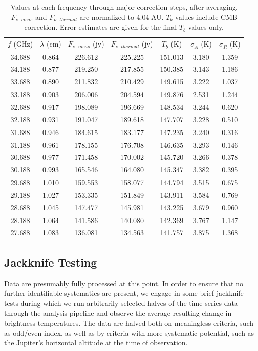 \documentclass{article}
\newcommand{\tableend}{\\}
\begin{document}
	\begin{table}
	\centering
	\begin{tabular}{cc || c | c | c | c | c }
	$f$ (GHz) & $\lambda$ (cm) & $F_{\nu,\,meas}$ (jy) & $F_{\nu,\,thermal}$ (jy) & $T_b$ (K) & $\sigma_{A}$ (K) & $\sigma_{R}$ (K) \\\hhline{==#=|=|=|=|=}
	34.688 & 0.864 & 226.612 & 225.225 & 151.013 & 3.180 & 1.359 \tableend
	34.188 & 0.877 & 219.250 & 217.855 & 150.385 & 3.143 & 1.186 \tableend
	33.688 & 0.890 & 211.832 & 210.429 & 149.615 & 3.222 & 1.037 \tableend
	33.188 & 0.903 & 206.006 & 204.594 & 149.876 & 2.531 & 1.244 \tableend
	32.688 & 0.917 & 198.089 & 196.669 & 148.534 & 3.244 & 0.620 \tableend
	32.188 & 0.931 & 191.047 & 189.618 & 147.707 & 3.228 & 0.510 \tableend
	31.688 & 0.946 & 184.615 & 183.177 & 147.235 & 3.240 & 0.316 \tableend
	31.188 & 0.961 & 178.155 & 176.708 & 146.635 & 3.293 & 0.146 \tableend
	30.688 & 0.977 & 171.458 & 170.002 & 145.720 & 3.266 & 0.378 \tableend
	30.188 & 0.993 & 165.546 & 164.080 & 145.347 & 3.382 & 0.395 \tableend
	29.688 & 1.010 & 159.553 & 158.077 & 144.794 & 3.515 & 0.675 \tableend
	29.188 & 1.027 & 153.335 & 151.849 & 143.911 & 3.584 & 0.769 \tableend
	28.688 & 1.045 & 147.477 & 145.981 & 143.225 & 3.679 & 0.960 \tableend
	28.188 & 1.064 & 141.586 & 140.080 & 142.369 & 3.767 & 1.147 \tableend
	27.688 & 1.083 & 136.081 & 134.563 & 141.757 & 3.875 & 1.368 \tableend
	\end{tabular}
	\caption{\label{tab:1}Values at each frequency through major correction steps, after averaging. $F_{\nu,\,meas}$ and $F_{\nu,\,thermal}$ are normalized to 4.04 AU. $T_b$ values include CMB correction. Error estimates are given for the final $T_b$ values only.}
	\end{table}


\subsection{Jackknife Testing} \label{s:jackknife}

	Data are presumably fully processed at this point.
	In order to ensure that no further identifiable systematics are present, we engage in some brief jackknife tests during which we run arbitrarily selected halves of the time-series data through the analysis pipeline and observe the average resulting change in brightness temperatures.
	The data are halved both on meaningless criteria, such as odd/even index, as well as by criteria with more systematic potential, such as the Jupiter's horizontal altitude at the time of observation.
\end{document}
